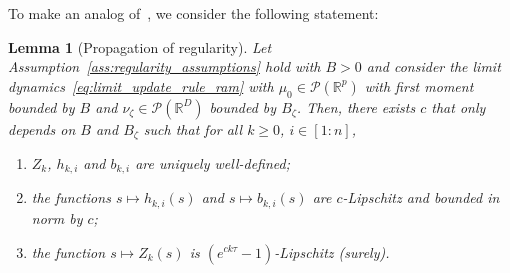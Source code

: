 \documentclass[a4paper,11pt]{article}
\newcommand{\R}{\mathbb{R}}
\newcommand{\1}{\mathbbm{1}}
\newtheorem{lemma}[theorem]{Lemma}
\theoremstyle{definition}
\theoremstyle{remark}
\begin{document}
To make an analog of~\cite[Lemma 5.2]{chizat2025hidden}, we consider the following statement:
\begin{lemma}[Propagation of regularity]\label{lem:propagation_of_regularity}
Let Assumption~\ref{ass:regularity_assumptions} hold with $B > 0$ and consider the limit dynamics~\eqref{eq:limit_update_rule_ram} with $\mu_0 \in \mathcal{P}(\R^p)$ with first moment bounded by $B$ {and $\nu_\zeta \in \mathcal{P}(\R^D)$ bounded by $B_\zeta$}. Then, there exists $c$ that only depends on $B$ {and $B_\zeta$} such that for all $k \geq 0$, $i \in [1:n]$,

\begin{enumerate}
    \item $Z_k$, $h_{k,i}$ and $b_{k,i}$ are uniquely well-defined;
    \item the functions $s \mapsto h_{k,i}(s)$ and $s \mapsto b_{k,i}(s)$ are $c$-Lipschitz and bounded in norm by $c$;
    \item the function $s \mapsto Z_k(s)$ is $(e^{ck\tau} - 1)$-Lipschitz (surely).
\end{enumerate}
\end{lemma}
\end{document}
